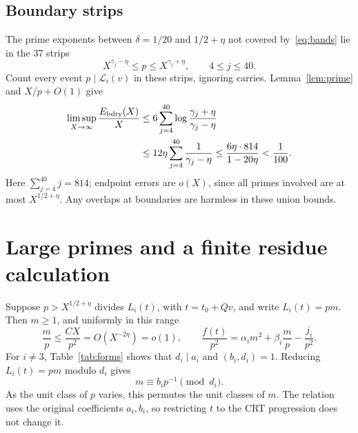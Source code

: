\documentclass[11pt,a4paper]{article}
\newcommand{\LL}{\mathcal L}
\newcommand{\1}{\mathbf 1}
\numberwithin{equation}{section}
\begin{document}
\subsection{Boundary strips}

The prime exponents between \(\delta=1/20\) and \(1/2+\eta\) not covered
by~\eqref{eq:bands} lie in the 37 strips
\[
 X^{\gamma_j-\eta}\leq p\leq X^{\gamma_j+\eta},\qquad 4\leq j\leq40.
\]
Count every event \(p\mid\LL_i(v)\) in these strips, ignoring carries.
Lemma~\ref{lem:prime} and \(X/p+O(1)\) give
\begin{equation}\label{eq:strips}
\begin{aligned}
 \limsup_{X\to\infty}\frac{E_{\rm bdry}(X)}X
 &\leq6\sum_{j=4}^{40}\log\frac{\gamma_j+\eta}{\gamma_j-\eta}\\
 &\leq12\eta\sum_{j=4}^{40}\frac1{\gamma_j-\eta}
 \leq\frac{6\eta\cdot814}{1-20\eta}<\frac1{100}.
\end{aligned}
\end{equation}
Here \(\sum_{j=4}^{40}j=814\); endpoint errors are \(o(X)\), since all
primes involved are at most \(X^{1/2+\eta}\). Any overlaps at boundaries
are harmless in these union bounds.

\section{Large primes and a finite residue calculation}\label{sec:large}

Suppose \(p>X^{1/2+\eta}\) divides \(L_i(t)\), with \(t=t_0+Qv\), and
write \(L_i(t)=pm\). Then \(m\geq1\), and uniformly in this range
\begin{equation}\label{eq:correction}
 \frac mp\leq\frac{CX}{p^2}=O(X^{-2\eta})=o(1),\qquad
 \frac{f(t)}{p^2}=\alpha_i m^2+\beta_i\frac mp-\frac{j_i}{p^2}.
\end{equation}
For \(i\neq3\), Table~\ref{tab:forms} shows that \(d_i\mid a_i\) and
\((b_i,d_i)=1\). Reducing \(L_i(t)=pm\) modulo \(d_i\) gives
\begin{equation}\label{eq:mclass}
 m\equiv b_ip^{-1}\pmod{d_i}.
\end{equation}
As the unit class of \(p\) varies, this permutes the unit classes of
\(m\). The relation uses the original coefficients \(a_i,b_i\), so
restricting \(t\) to the CRT progression does not change it.
\end{document}
